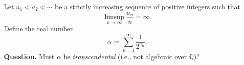 Let $a_1<a_2<\cdots$ be a strictly increasing sequence of positive integers such that
\[
\limsup_{n\to\infty}\frac{a_n}{n}=\infty.
\]
Define the real number
\[
\alpha \coloneqq \sum_{n=1}^{\infty} \frac{1}{2^{a_n}}.
\]
\noindent\textbf{Question.} Must $\alpha$ be \emph{transcendental} (i.e., not algebraic over $\mathbb{Q}$)?
